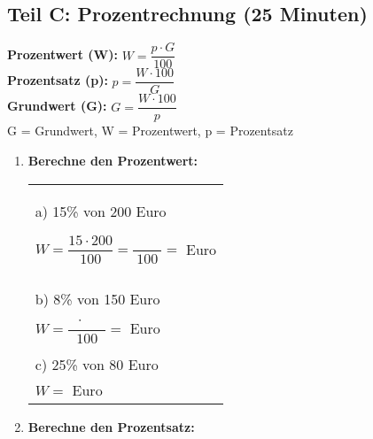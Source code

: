 \subsection*{Teil C: Prozentrechnung (25 Minuten)}

\begin{merkbox}[Prozentformeln]
    \textbf{Prozentwert (W):} $W = \dfrac{p \cdot G}{100}$ \\
    \textbf{Prozentsatz (p):} $p = \dfrac{W \cdot 100}{G}$ \\  
    \textbf{Grundwert (G):} $G = \dfrac{W \cdot 100}{p}$ \\
    G = Grundwert, W = Prozentwert, p = Prozentsatz
\end{merkbox}

\begin{enumerate}[label=\arabic*., resume]

    \item \textbf{Berechne den Prozentwert:}

    \vspace{0.5cm}

    \begin{tabular}{l}
        a) 15\% von 200 Euro

        \vspace{0.3cm}
        $W = \dfrac{15 \cdot 200}{100} = \dfrac{\phantom{0000}}{100} = $ \underline{\hspace{2cm}} Euro
        \\
        \vspace{0.5cm}
        \\
        b) 8\% von 150 Euro
        \\
        \vspace{0.3cm}
        $W = \dfrac{\phantom{0} \cdot \phantom{000}}{100} = $ \underline{\hspace{2cm}} Euro
        \\
        \vspace{0.5cm}
        \\
        c) 25\% von 80 Euro
        \\
        \vspace{0.3cm}
        $W = $ \underline{\hspace{4cm}} Euro
    \end{tabular}

    \vspace{1cm}

    \item \textbf{Berechne den Prozentsatz:}


\end{enumerate}
